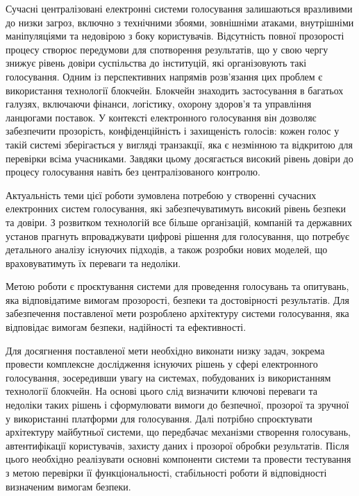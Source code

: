 \documentclass[14pt]{extreport}
\begin{document}
  Сучасні централізовані електронні системи голосування залишаються вразливими до низки загроз, включно з технічними збоями, зовнішніми атаками, внутрішніми маніпуляціями та недовірою з боку користувачів. Відсутність повної прозорості процесу створює передумови для спотворення результатів, що у свою чергу знижує рівень довіри суспільства до інституцій, які організовують такі голосування. Одним із перспективних напрямів розв'язання цих проблем є використання технології блокчейн. Блокчейн знаходить застосування в багатьох галузях, включаючи фінанси, логістику, охорону здоров'я та управління ланцюгами поставок. У контексті електронного голосування він дозволяє забезпечити прозорість, конфіденційність і захищеність голосів: кожен голос у такій системі зберігається у вигляді транзакції, яка є незмінною та відкритою для перевірки всіма учасниками. Завдяки цьому досягається високий рівень довіри до процесу голосування навіть без централізованого контролю.

  Актуальність теми цієї роботи зумовлена потребою у створенні сучасних електронних систем голосування, які забезпечуватимуть високий рівень безпеки та довіри. З розвитком технологій все більше організацій, компаній та державних установ прагнуть впроваджувати цифрові рішення для голосування, що потребує детального аналізу існуючих підходів, а також розробки нових моделей, що враховуватимуть їх переваги та недоліки.

  Метою роботи є проєктування системи для проведення голосувань та опитувань, яка відповідатиме вимогам прозорості, безпеки та достовірності результатів. Для забезпечення поставленої мети розроблено архітектуру системи голосування, яка відповідає вимогам безпеки, надійності та ефективності.

  Для досягнення поставленої мети необхідно виконати низку задач, зокрема провести комплексне дослідження існуючих рішень у сфері електронного голосування, зосередивши увагу на системах, побудованих із використанням технології блокчейн. На основі цього слід визначити ключові переваги та недоліки таких рішень і сформулювати вимоги до безпечної, прозорої та зручної у використанні платформи для голосування. Далі потрібно спроєктувати архітектуру майбутньої системи, що передбачає механізми створення голосувань, автентифікації користувачів, захисту даних і прозорої обробки результатів. Після цього необхідно реалізувати основні компоненти системи та провести тестування з метою перевірки її функціональності, стабільності роботи й відповідності визначеним вимогам безпеки.
\end{document}
